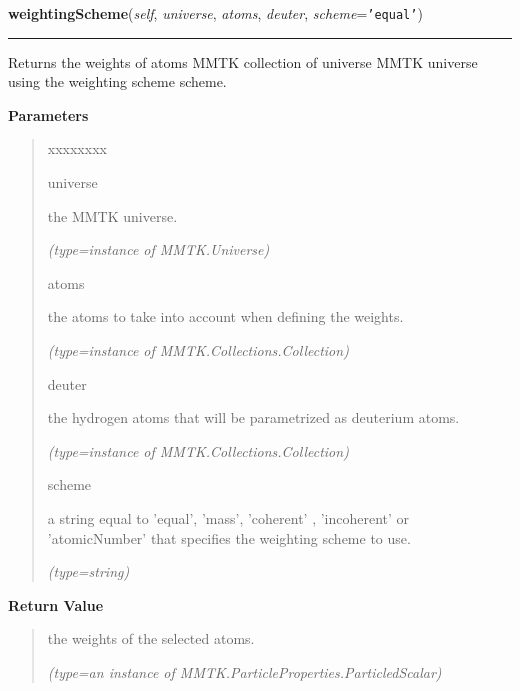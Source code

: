     \vspace{0.5ex}

\hspace{.8\funcindent}\begin{boxedminipage}{\funcwidth}

    \raggedright \textbf{weightingScheme}(\textit{self}, \textit{universe}, \textit{atoms}, \textit{deuter}, \textit{scheme}={\tt 'equal'})

    \vspace{-1.5ex}

    \rule{\textwidth}{0.5\fboxrule}
\setlength{\parskip}{2ex}
    Returns the weights of {\textbar}atoms{\textbar} MMTK collection of 
    {\textbar}universe{\textbar} MMTK universe using the weighting scheme 
    {\textbar}scheme{\textbar}.

\setlength{\parskip}{1ex}
      \textbf{Parameters}
      \vspace{-1ex}

      \begin{quote}
        \begin{Ventry}{xxxxxxxx}

          \item[universe]

          the MMTK universe.

            {\it (type=instance of MMTK.Universe)}

          \item[atoms]

          the atoms to take into account when defining the weights.

            {\it (type=instance of MMTK.Collections.Collection)}

          \item[deuter]

          the hydrogen atoms that will be parametrized as deuterium atoms.

            {\it (type=instance of MMTK.Collections.Collection)}

          \item[scheme]

          a string equal to 'equal', 'mass', 'coherent' , 'incoherent' or 
          'atomicNumber' that specifies the weighting scheme to use.

            {\it (type=string)}

        \end{Ventry}

      \end{quote}

      \textbf{Return Value}
    \vspace{-1ex}

      \begin{quote}
      the weights of the selected atoms.

      {\it (type=an instance of MMTK.ParticleProperties.ParticledScalar)}

      \end{quote}

    \end{boxedminipage}

